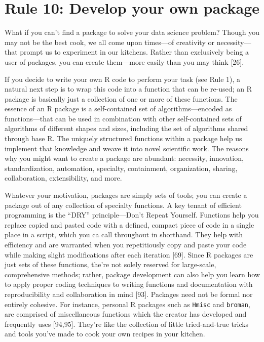 \documentclass[10pt,letterpaper]{article}
\begin{document}
\hypertarget{rule-10-develop-your-own-package}{%
\section{Rule 10: Develop your own
package}\label{rule-10-develop-your-own-package}}

What if you can't find a package to solve your data science problem?
Though you may not be the best cook, we all come upon times---of
creativity or necessity---that prompt us to experiment in our kitchens.
Rather than exclusively being a user of packages, you can create
them---more easily than you may think {[}26{]}.

If you decide to write your own R code to perform your task (see Rule
1), a natural next step is to wrap this code into a function that can be
re-used; an R package is basically just a collection of one or more of
these functions. The essence of an R package is a self-contained set of
algorithms---encoded as functions---that can be used in combination with
other self-contained sets of algorithms of different shapes and sizes,
including the set of algorithms shared through base R. The uniquely
structured functions within a package help us implement that knowledge
and weave it into novel scientific work. The reasons why you might want
to create a package are abundant: necessity, innovation,
standardization, automation, specialty, containment, organization,
sharing, collaboration, extensibility, and more.

Whatever your motivation, packages are simply sets of tools; you can
create a package out of any collection of specialty functions. A key
tenant of efficient programming is the ``DRY'' principle---Don't Repeat
Yourself. Functions help you replace copied and pasted code with a
defined, compact piece of code in a single place in a script, which you
ca call throughout in shorthand. They help with efficiency and are
warranted when you repetitiously copy and paste your code while making
slight modifications after each iteration {[}69{]}. Since R packages are
just sets of these functions, the're not solely reserved for
large-scale, comprehensive methods; rather, package development can also
help you learn how to apply proper coding techniques to writing
functions and documentation with reproducibility and collaboration in
mind {[}93{]}. Packages need not be formal nor entirely cohesive. For
instance, personal R packages such as \texttt{Hmisc} and
\texttt{broman}, are comprised of miscellaneous functions which the
creator has developed and frequently uses {[}94,95{]}. They're like the
collection of little tried-and-true tricks and tools you've made to cook
your own recipes in your kitchen.
\end{document}
